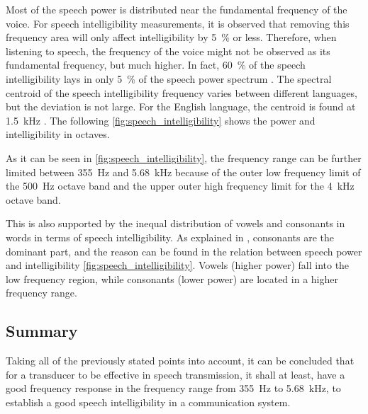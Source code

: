 Most of the speech power is distributed near the fundamental frequency of the voice. For speech intelligibility measurements, it is observed that removing this frequency area will only affect intelligibility by \SI{5}{\percent} or less. Therefore, when listening to speech, the frequency of the voice might not be observed as its fundamental frequency, but much higher. In fact, \SI{60}{\percent} of the speech intelligibility lays in only \SI{5}{\percent} of the speech power spectrum \citep{arl_us_army}. The spectral centroid of the speech intelligibility frequency varies between different languages, but the deviation is not large. For the English language, the centroid is found at \SI{1.5}{\kilo\hertz} \citep{arl_us_army}. The following \autoref{fig:speech_intelligibility} shows the power and intelligibility in octaves. 



As it can be seen in \autoref{fig:speech_intelligibility}, the frequency range can be further limited between \SI{355}{\hertz} and \SI{5.68}{\kilo\hertz} because of the outer low frequency limit of the \SI{500}{\hertz} octave band and the upper outer high frequency limit for the \SI{4}{\kilo\hertz} octave band. 

This is also supported by the inequal distribution of vowels and consonants in words in terms of speech intelligibility. As explained in \citep{arl_us_army}, consonants are the dominant part, and the reason can be found in the relation between speech power and intelligibility \autoref{fig:speech_intelligibility}. Vowels (higher power) fall into the low frequency region, while consonants (lower power) are located in a higher frequency range.

\subsection{Summary}
Taking all of the previously stated points into account, it can be concluded that for a transducer to be effective in speech transmission, it shall at least, have a good frequency response in the frequency range from \SI{355}{\hertz} to \SI{5.68}{\kilo\hertz}, to establish a good speech intelligibility in a communication system.

